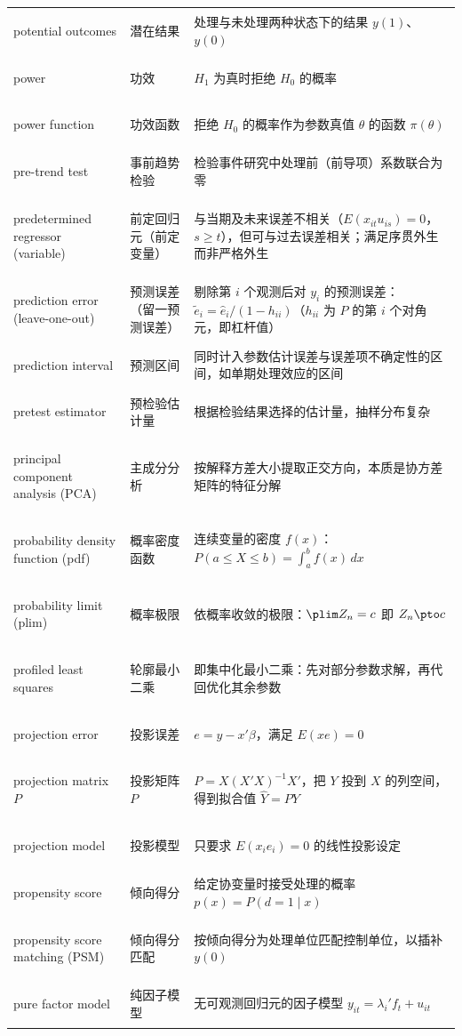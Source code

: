 \begin{longtable}{@{}>{\bfseries\boldmath\raggedright\arraybackslash}p{4.6cm}>{\raggedright\arraybackslash}p{3.2cm}>{\raggedright\arraybackslash}p{\dimexpr\textwidth-7.8cm-4\tabcolsep\relax}@{}}
potential outcomes & 潜在结果 & 处理与未处理两种状态下的结果 $y(1)$、$y(0)$ \\
power & 功效 & $H_1$ 为真时拒绝 $H_0$ 的概率 \\
power function & 功效函数 & 拒绝 $H_0$ 的概率作为参数真值 $\theta$ 的函数 $\pi(\theta)$ \\
pre-trend test & 事前趋势检验 & 检验事件研究中处理前（前导项）系数联合为零 \\
predetermined regressor (variable) & 前定回归元（前定变量） & 与当期及未来误差不相关（$E(x_{it}u_{is})=0$，$s\ge t$），但可与过去误差相关；满足序贯外生而非严格外生 \\
prediction error (leave-one-out) & 预测误差（留一预测误差） & 剔除第 $i$ 个观测后对 $y_i$ 的预测误差：$\tilde e_i=\hat e_i/(1-h_{ii})$（$h_{ii}$ 为 $P$ 的第 $i$ 个对角元，即杠杆值） \\
prediction interval & 预测区间 & 同时计入参数估计误差与误差项不确定性的区间，如单期处理效应的区间 \\
pretest estimator & 预检验估计量 & 根据检验结果选择的估计量，抽样分布复杂 \\
principal component analysis (PCA) & 主成分分析 & 按解释方差大小提取正交方向，本质是协方差矩阵的特征分解 \\
probability density function (pdf) & 概率密度函数 & 连续变量的密度 $f(x)$：$P(a\le X\le b)=\int_a^bf(x)\,dx$ \\
probability limit (plim) & 概率极限 & 依概率收敛的极限：$\plim Z_n=c$ 即 $Z_n\pto c$ \\
profiled least squares & 轮廓最小二乘 & 即集中化最小二乘：先对部分参数求解，再代回优化其余参数 \\
projection error & 投影误差 & $e=y-x'\beta$，满足 $E(xe)=0$ \\
projection matrix $P$ & 投影矩阵 $P$ & $P=X(X'X)^{-1}X'$，把 $Y$ 投到 $X$ 的列空间，得到拟合值 $\hat Y=PY$ \\
projection model & 投影模型 & 只要求 $E(x_ie_i)=0$ 的线性投影设定 \\
propensity score & 倾向得分 & 给定协变量时接受处理的概率 $p(x)=P(d=1\mid x)$ \\
propensity score matching (PSM) & 倾向得分匹配 & 按倾向得分为处理单位匹配控制单位，以插补 $y(0)$ \\
pure factor model & 纯因子模型 & 无可观测回归元的因子模型 $y_{it}=\lambda_i'f_t+u_{it}$ \\
\end{longtable}

\par{}\ifdim\dimexpr\pagegoal-\pagetotal\relax<16\baselineskip\newpage\fi
